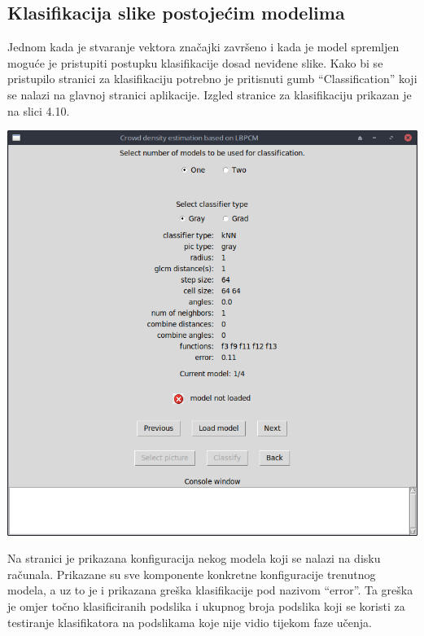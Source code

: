 \documentclass[times, utf8, zavrsni]{fer}
\begin{document}
\subsection{Klasifikacija slike postojećim modelima}

Jednom kada je stvaranje vektora značajki završeno i kada je model spremljen 
moguće je pristupiti postupku klasifikacije dosad neviđene slike. 
Kako bi se pristupilo stranici za klasifikaciju potrebno je 
pritisnuti gumb \enquote{Classification} koji se nalazi na glavnoj 
stranici aplikacije. Izgled stranice za klasifikaciju prikazan je na 
slici 4.10.

\begin{minipage}{\linewidth}
\centering
\includegraphics[scale=0.4]{img/cl1.png}
\end{minipage}

\bigbreak 

Na stranici je prikazana konfiguracija nekog modela koji se nalazi na 
disku računala. Prikazane su sve komponente konkretne konfiguracije
trenutnog modela, a uz to je i prikazana greška klasifikacije pod
nazivom \enquote{error}. Ta greška je omjer točno klasificiranih
podslika i ukupnog broja podslika koji se koristi za testiranje klasifikatora
na podslikama koje nije vidio tijekom faze učenja. 
\end{document}
